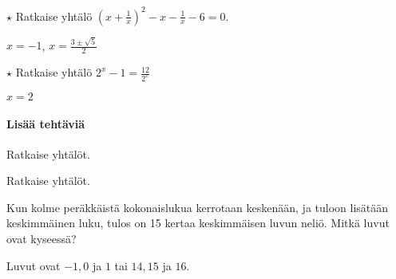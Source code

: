 \begin{tehtavasivu}
\begin{tehtava}
	$ \star $ Ratkaise yhtälö $(x+\frac{1}{x})^2-x-\frac{1}{x}-6 = 0$.
	\begin{vastaus}
		$x = -1$, $x = \frac{3\pm \sqrt{5}}{2}$
	\end{vastaus}
\end{tehtava}

\begin{tehtava}
	$ \star $ Ratkaise yhtälö $2^x-1=\frac{12}{2^x}$
	\begin{vastaus}
	$x=2$
	\end{vastaus}
\end{tehtava}

\paragraph*{Lisää tehtäviä}

\begin{tehtava}
    Ratkaise yhtälöt.
    \begin{alakohdat}
    \end{alakohdat}
    \begin{vastaus}
        \begin{alakohdat}
        \end{alakohdat}
    \end{vastaus}
\end{tehtava}

\begin{tehtava}
    Ratkaise yhtälöt.
    \begin{alakohdat}
    \end{alakohdat}
    \begin{vastaus}
        \begin{alakohdat}
        \end{alakohdat}
    \end{vastaus}
\end{tehtava}

\begin{tehtava} %
Kun kolme peräkkäistä kokonaislukua kerrotaan keskenään, ja tuloon
lisätään keskimmäinen luku, tulos on 15 kertaa keskimmäisen luvun neliö.
Mitkä luvut ovat kyseessä?
    \begin{vastaus}
	Luvut ovat $-1, 0$ ja $1$ tai $14, 15$ ja $16$.
    \end{vastaus}
\end{tehtava}


\end{tehtavasivu}
